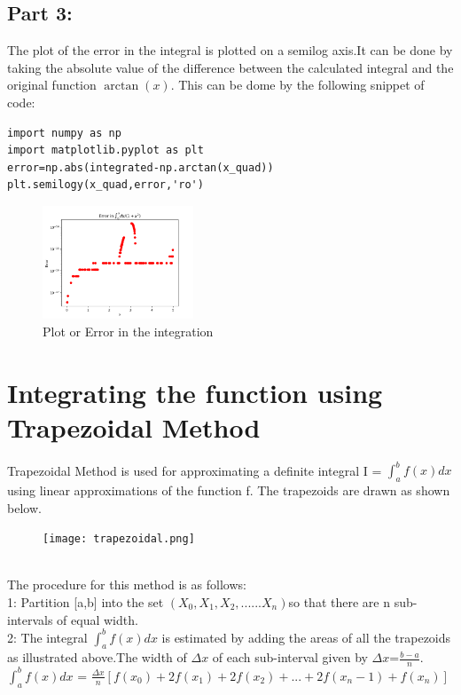 \documentclass[11pt, a3paper, twocolumn]{article}
\begin{document}
\subsection{Part 3:}
The plot of the error in the integral is plotted on a semilog axis.It can be done by taking the absolute value of the difference between the calculated integral and the original function $\arctan(x)$. This can be dome by the following snippet of code:\\
\begin{verbatim}
import numpy as np
import matplotlib.pyplot as plt
error=np.abs(integrated-np.arctan(x_quad))
plt.semilogy(x_quad,error,'ro')
\end{verbatim}
\begin{figure}[h!]
  \includegraphics[width=0.4\textwidth, right]{Fig3.png}
  \caption{Plot or Error in the integration}
\end{figure}

\section{Integrating the function using Trapezoidal Method}
Trapezoidal Method is used for approximating a definite integral  I = $\int_{a}^{b} f(x)dx$ using linear approximations of the function f.
The trapezoids are drawn as shown below.\\
\begin{figure}[h!]
  \texttt{[image: trapezoidal.png]}
\end{figure}\\
The procedure for this method is as follows:\\
1: Partition [a,b] into the set $(X_0,X_1,X_2,......X_n) $so that there are n sub-intervals of equal width.\\
2: The integral $\int_{a}^{b} f(x)dx$ is estimated by adding the areas of all the trapezoids as illustrated above.The width of $\Delta{x}$ of each sub-interval given by $\Delta{x}$=$\frac{b-a}{n}$.\\
$\int_{a}^{b} f(x)dx$ = $\frac{\Delta{x}}{n} [ f(x_0)+2f(x_1)+2f(x_2)+...+2f(x_n-1)+f(x_n) ]$\\
\end{document}
